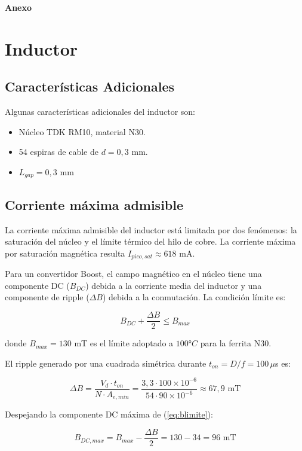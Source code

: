 \appendix
\huge{\textbf{Anexo}}
\section{Inductor}

\subsection{Características Adicionales}
Algunas características adicionales del inductor son:

\begin{itemize}
    \item Núcleo TDK RM10, material N30.
    \item 54 espiras de cable de $d = 0,3$ mm.
    \item $L_{gap} = 0,3$ mm
\end{itemize}

\subsection{Corriente máxima admisible}

La corriente máxima admisible del inductor está limitada por dos fenómenos: la saturación del núcleo y el límite térmico del hilo de cobre. La corriente máxima por saturación magnética resulta $I_{pico,sat} \approx 618$ mA.

Para un convertidor Boost, el campo magnético en el núcleo tiene una componente DC ($B_{DC}$) debida a la corriente media del inductor y una componente de ripple ($\Delta B$) debida a la conmutación. La condición límite es:

\begin{equation}
    B_{DC} + \frac{\Delta B}{2} \leq B_{max}
    \label{eq:blimite}
\end{equation}

donde $B_{max} = 130$ mT es el límite adoptado a $100°C$ para la ferrita N30.

El ripple generado por una cuadrada simétrica durante $t_{on} = D/f = 100\,\mu$s es:

\begin{equation}
    \Delta B = \frac{V_d \cdot t_{on}}{N \cdot A_{e,min}} = \frac{3,3 \cdot 100\times10^{-6}}{54 \cdot 90\times10^{-6}} \approx 67,9\text{ mT}
    \label{eq:deltaB}
\end{equation}

Despejando la componente DC máxima de (\ref{eq:blimite}):

\begin{equation}
    B_{DC,max} = B_{max} - \frac{\Delta B}{2} = 130 - 34 = 96\text{ mT}
    \label{eq:bdcmax}
\end{equation}

